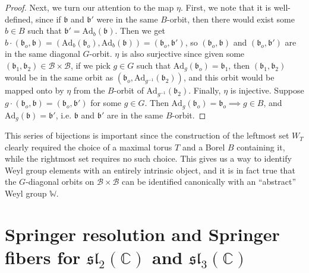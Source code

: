 \documentclass[11pt]{article}
\newcommand{\C}{\mathbb{C}}
\theoremstyle{definition}
\numberwithin{equation}{section} %
\begin{document}
\begin{proof}
    \noindent Next, we turn our attention to the map $\eta$. First, we note that it is well-defined, since if $\mathfrak{b}$ and $\mathfrak{b}'$ were in the same $B$-orbit, then there would exist some $b\in B$ such that $\mathfrak{b}' = \mathrm{Ad}_b(\mathfrak{b})$. Then we get $b\cdot \left(\mathfrak{b}_o, \mathfrak{b}\right) = \left(\mathrm{Ad}_b\left(\mathfrak{b}_o\right), \mathrm{Ad}_b\left(\mathfrak{b}\right)\right) = \left(\mathfrak{b}_o, \mathfrak{b}'\right)$, so $\left(\mathfrak{b}_o, \mathfrak{b}\right)$ and $\left(\mathfrak{b}_o, \mathfrak{b}'\right)$ are in the same diagonal $G$-orbit. $\eta$ is also surjective since given some $\left(\mathfrak{b}_1, \mathfrak{b}_2\right)\in \mathcal{B}\times \mathcal{B}$, if we pick $g \in G$ such that $\mathrm{Ad}_g\left(\mathfrak{b}_o\right) = \mathfrak{b}_1$, then $\left(\mathfrak{b}_1, \mathfrak{b}_2\right)$ would be in the same orbit as $\left(\mathfrak{b}_o, \mathrm{Ad}_{g^{-1}}\left(\mathfrak{b}_2\right)\right)$, and this orbit would be mapped onto by $\eta$ from the $B$-orbit of $\mathrm{Ad}_{g^{-1}}\left(\mathfrak{b}_2\right)$. Finally, $\eta$ is injective. Suppose $g\cdot \left(\mathfrak{b}_o, \mathfrak{b}\right) = \left(\mathfrak{b}_o, \mathfrak{b}'\right)$ for some $g\in G$. Then $\mathrm{Ad}_g \left(\mathfrak{b}_o\right)= \mathfrak{b}_o \implies g\in B$, and $\mathrm{Ad}_g(\mathfrak{b})  =\mathfrak{b}'$, i.e. $\mathfrak{b}$ and $\mathfrak{b}'$ are in the same $B$-orbit.
\end{proof}

\noindent This series of bijections is important since the construction of the leftmost set $W_T$ clearly required the choice of a maximal torus $T$ and a Borel $B$ containing it, while the rightmost set requires no such choice. This gives us a way to identify Weyl group elements with an entirely intrinsic object, and it is in fact true that the $G$-diagonal orbits on $\mathcal{B}\times \mathcal{B}$ can be identified canonically with an ``abstract'' Weyl group $\mathbb{W}$.

\section{Springer resolution and Springer fibers for $\mathfrak{sl}_2(\C)$ and $\mathfrak{sl}_3(\C)$}
\end{document}
